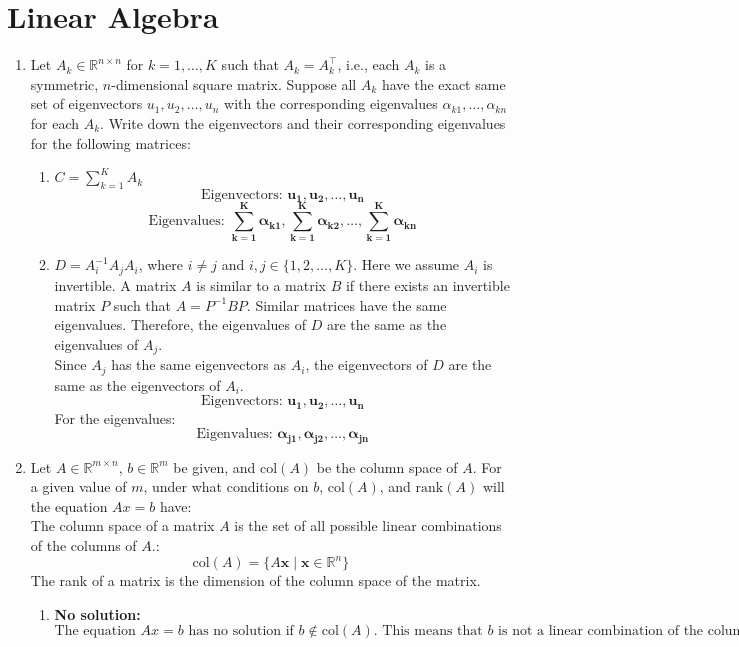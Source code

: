 \documentclass[a3paper,12pt]{extarticle} %
\begin{document}
\section{Linear Algebra}
\begin{enumerate}
    \item Let \( A_k \in \mathbb{R}^{n \times n} \) for \( k = 1, \ldots, K \) such that \( A_k = A_k^\top \), i.e., each \( A_k \) is a symmetric, \( n \)-dimensional square matrix. Suppose all \( A_k \) have the exact same set of eigenvectors \( u_1, u_2, \ldots, u_n \) with the corresponding eigenvalues \( \alpha_{k1}, \ldots, \alpha_{kn} \) for each \( A_k \). Write down the eigenvectors and their corresponding eigenvalues for the following matrices:
    \begin{enumerate}
        \item \( C = \sum_{k=1}^K A_k \)
        \[
        \text{Eigenvectors: } \mathbf{u_1, u_2, \ldots, u_n}
        \]
        \[
        \text{Eigenvalues: } \mathbf{\sum_{k=1}^K \alpha_{k1}, \sum_{k=1}^K \alpha_{k2}, \ldots, \sum_{k=1}^K \alpha_{kn}}
        \]

        \item \( D = A_i^{-1} A_j A_i \), where \( i \neq j \) and \( i, j \in \{1, 2, \ldots, K\} \). Here we assume \( A_i \) is invertible.
        A matrix \(A\) is similar to a matrix \(B\) if there exists an invertible matrix \(P\) such that \(A = P^{-1}BP\). Similar matrices have the same eigenvalues. Therefore, the eigenvalues of \(D\) are the same as the eigenvalues of \(A_j\).
        \\ Since \(A_j\) has the same eigenvectors as \(A_i\), the eigenvectors of \(D\) are the same as the eigenvectors of \(A_i\).
        \[
        \text{Eigenvectors: } \mathbf{ u_1, u_2, \ldots, u_n}
        \]
        For the eigenvalues:
        \[
        \text{Eigenvalues: } \mathbf{ \alpha_{j1}, \alpha_{j2}, \ldots, \alpha_{jn}}
        \]
        
    \end{enumerate}
    \item Let \( A \in \mathbb{R}^{m \times n} \), \( b \in \mathbb{R}^m \) be given, and \(\text{col}(A)\) be the column space of \( A \). For a given value of \( m \), under what conditions on \( b \), \(\text{col}(A)\), and \(\text{rank}(A)\) will the equation \( Ax = b \) have:
    \\ The column space of a matrix \(A\) is the set of all possible linear combinations of the columns of \(A\).:
    \[
    \text{col}(A) = \{ A \mathbf{x} \mid \mathbf{x} \in \mathbb{R}^n \}
    \]
     The rank of a matrix is the dimension of the column space of the matrix.
    \begin{enumerate}
        \item \textbf{No solution:} 
        \[
        \text{The equation } Ax = b \text{ has no solution if } b \notin \text{col}(A). \text{ This means that } b \text{ is not a linear combination of the columns of } A.
        \]
        

\end{enumerate}
\end{enumerate}
\end{document}
